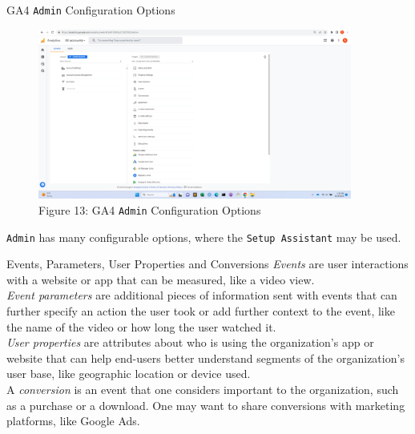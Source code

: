 \documentclass[pdf]{beamer}
\theoremstyle{remark}
\theoremstyle{definition}
\begin{document}
\begin{frame}[t]{GA4 \texttt{Admin} Configuration Options}
\begin{figure}[htbp]
  \captionsetup{justification=centering}
  \includegraphics[height=5.6cm, trim=1.5cm 0.0cm 2.0cm 0.0cm width=5.6cm]{Images/GA4_4_091923_Admin.png}
  \caption{Figure {\color{franklinblue} 13}: GA4 \texttt{Admin} Configuration Options}
\end{figure}
\vspace{-2.0ex}
\texttt{Admin} has many configurable options, where the \texttt{Setup Assistant} may be used.  
\end{frame}

\begin{frame}[t]{Events, Parameters, User Properties and  Conversions}
\textit{Events} are user interactions with a website or app that can be measured, like a video view. \\
\vspace{1.5ex}
\textit{Event parameters} are additional pieces of information sent with events that can further specify an action the user took or add further context to the event, like the name of the video or how long the user watched it. \\
\vspace{1.5ex}
\textit{User properties} are attributes about who is using the organization's app or website that can help end-users better understand segments of the organization's user base, like geographic location or device used. \\
\vspace{1.5ex}
A \textit{conversion} is an event that one considers important to the organization, such as a purchase or a download. One may want to share conversions with marketing platforms, like Google Ads.
\end{frame}
\end{document}
